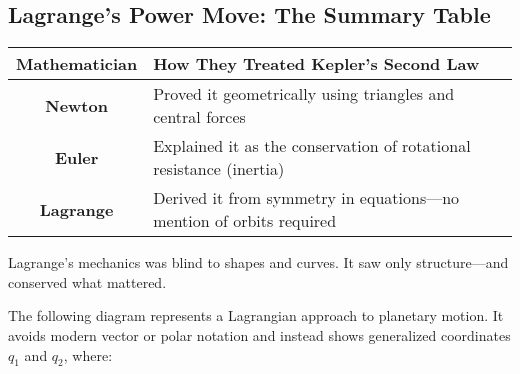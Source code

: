 \subsection{Lagrange’s Power Move: The Summary Table}

\begin{center}
\renewcommand{\arraystretch}{1.5}
\begin{tabular}{|c|l|}
\hline
\textbf{Mathematician} & \textbf{How They Treated Kepler’s Second Law} \\ \hline
\textbf{Newton} & Proved it geometrically using triangles and central forces \\ \hline
\textbf{Euler} & Explained it as the conservation of rotational resistance (inertia) \\ \hline
\textbf{Lagrange} & Derived it from symmetry in equations—no mention of orbits required \\ \hline
\end{tabular}
\end{center}

\vspace{0.5em}

Lagrange’s mechanics was blind to shapes and curves.  
It saw only structure—and conserved what mattered.


The following diagram represents a Lagrangian approach to planetary motion. It avoids modern vector or polar notation and instead shows generalized coordinates \( q_1 \) and \( q_2 \), where:

